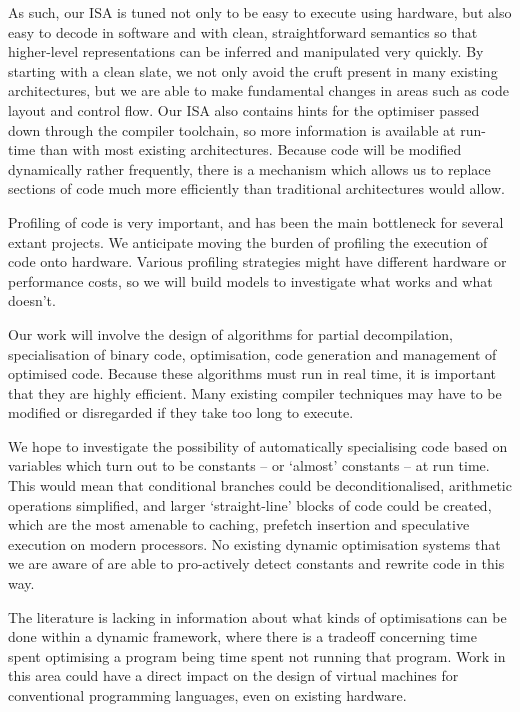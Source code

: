 \documentclass[11pt,letterpaper,onecolumn,notitlepage]{article}
\begin{document}
As such, our ISA is tuned not only to be easy to execute using hardware, but also easy to decode in software and with clean, straightforward semantics so that higher-level representations can be inferred and manipulated very quickly. By starting with a clean slate, we not only avoid the cruft present in many existing architectures, but we are able to make fundamental changes in areas such as code layout and control flow. Our ISA also contains hints for the optimiser passed down through the compiler toolchain, so more information is available at run-time than with most existing architectures. Because code will be modified dynamically rather frequently, there is a mechanism which allows us to replace sections of code much more efficiently than traditional architectures would allow.

Profiling of code is very important, and has been the main bottleneck for several extant projects. We anticipate moving the burden of profiling the execution of code onto hardware. Various profiling strategies might have different hardware or performance costs, so we will build models to investigate what works and what doesn't.

Our work will involve the design of algorithms for partial decompilation, specialisation of binary code, optimisation, code generation and management of optimised code. Because these algorithms must run in real time, it is important that they are highly efficient. Many existing compiler techniques may have to be modified or disregarded if they take too long to execute. 

We hope to investigate the possibility of automatically specialising code based on variables which turn out to be constants -- or `almost' constants -- at run time. This would mean that conditional branches could be deconditionalised, arithmetic operations simplified, and larger `straight-line' blocks of code could be created, which are the most amenable to caching, prefetch insertion and speculative execution on modern processors. No existing dynamic optimisation systems that we are aware of are able to pro-actively detect constants and rewrite code in this way.

The literature is lacking in information about what kinds of optimisations can be done within a dynamic framework, where there is a tradeoff concerning time spent optimising a program being time spent not running that program. Work in this area could have a direct impact on the design of virtual machines for conventional programming languages, even on existing hardware.
\end{document}
